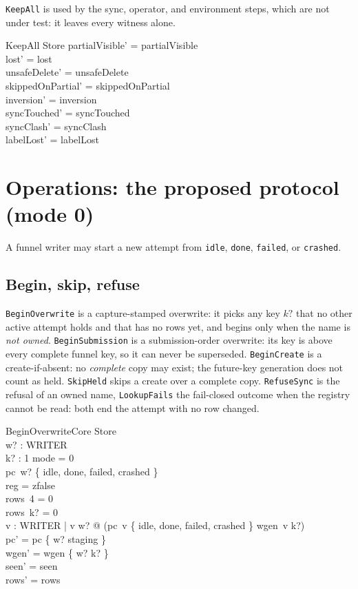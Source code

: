 \documentclass[a4paper,10pt,fleqn]{article}
\newcommand{\field}[1]{\texttt{#1}}
\begin{document}
\field{KeepAll} is used by the sync, operator, and environment steps, which are
not under test: it leaves every witness alone.

\begin{schema}{KeepAll}
\Delta Store
\where
partialVisible' = partialVisible \\
lost' = lost \\
unsafeDelete' = unsafeDelete \\
skippedOnPartial' = skippedOnPartial \\
inversion' = inversion \\
syncTouched' = syncTouched \\
syncClash' = syncClash \\
labelLost' = labelLost
\end{schema}

\section{Operations: the proposed protocol (mode 0)}
\label{sec:ops}

A funnel writer may start a new attempt from \field{idle}, \field{done},
\field{failed}, or \field{crashed}.

\subsection{Begin, skip, refuse}

\field{BeginOverwrite} is a capture-stamped overwrite: it picks any key $k?$
that no other active attempt holds and that has no rows yet, and begins only
when the name is \emph{not owned}. \field{BeginSubmission} is a
submission-order overwrite: its key is above every complete funnel key, so it
can never be superseded. \field{BeginCreate} is a create-if-absent: no
\emph{complete} copy may exist; the future-key generation does not count as
held. \field{SkipHeld} skips a create over a complete copy.
\field{RefuseSync} is the refusal of an owned name, \field{LookupFails} the
fail-closed outcome when the registry cannot be read: both end the attempt
with no row changed.

\begin{schema}{BeginOverwriteCore}
\Delta Store \\ w? : WRITER \\ k? : 1 
\where
mode = 0 \\
pc~w? \in \{ idle, done, failed, crashed \} \\
reg = zfalse \\
rows~4 = 0 \\
rows~k? = 0 \\
\forall v : WRITER | v \neq w? @
  (pc~v \in \{ idle, done, failed, crashed \} \lor wgen~v \neq k?) \\
pc' = pc \oplus \{ w? \mapsto staging \} \\
wgen' = wgen \oplus \{ w? \mapsto k? \} \\
seen' = seen \\
rows' = rows
\end{schema}
\end{document}
